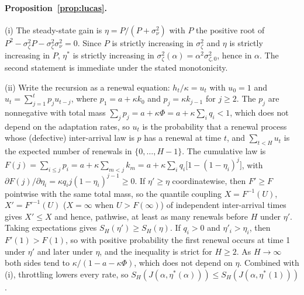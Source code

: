 \paragraph{Proposition~\ref{prop:lucas}.} (i) The steady-state gain is $\eta=P/(P+\sigma_\nu^2)$ with $P$ the positive root of $P^2-\sigma_\zeta^2P-\sigma_\zeta^2\sigma_\nu^2=0$. Since $P$ is strictly increasing in $\sigma_\zeta^2$ and $\eta$ is strictly increasing in $P$, $\eta^*$ is strictly increasing in $\sigma_\zeta^2(\alpha)=\alpha^2\sigma_{\zeta,0}^2$, hence in $\alpha$. The second statement is immediate under the stated monotonicity.

(ii) Write the recursion as a renewal equation: $h_t/\kappa=u_t$ with $u_0=1$ and $u_t=\sum_{j=1}^tp_ju_{t-j}$, where $p_1=a+\kappa k_0$ and $p_j=\kappa k_{j-1}$ for $j\ge2$. The $p_j$ are nonnegative with total mass $\sum_jp_j=a+\kappa\Phi=a+\kappa\sum_iq_i<1$, which does not depend on the adaptation rates, so $u_t$ is the probability that a renewal process whose (defective) inter-arrival law is $p$ has a renewal at time $t$, and $\sum_{t<H}u_t$ is the expected number of renewals in $\{0,\ldots,H-1\}$. The cumulative law is $F(j)=\sum_{i\le j}p_i=a+\kappa\sum_{m<j}k_m=a+\kappa\sum_iq_i\bigl[1-(1-\eta_i)^j\bigr]$, with $\partial F(j)/\partial\eta_i=\kappa q_ij(1-\eta_i)^{j-1}\ge0$. If $\eta'\ge\eta$ coordinatewise, then $F'\ge F$ pointwise with the same total mass, so the quantile coupling $X=F^{-1}(U)$, $X'=F'^{-1}(U)$ ($X=\infty$ when $U>F(\infty)$) of independent inter-arrival times gives $X'\le X$ and hence, pathwise, at least as many renewals before $H$ under $\eta'$. Taking expectations gives $S_H(\eta')\ge S_H(\eta)$. If $q_i>0$ and $\eta'_i>\eta_i$, then $F'(1)>F(1)$, so with positive probability the first renewal occurs at time 1 under $\eta'$ and later under $\eta$, and the inequality is strict for $H\ge2$. As $H\to\infty$ both sides tend to $\kappa/(1-a-\kappa\Phi)$, which does not depend on $\eta$. Combined with (i), throttling lowers every rate, so $S_H(J(\alpha,\eta^*(\alpha)))\le S_H(J(\alpha,\eta^*(1)))$.

